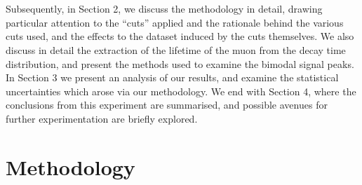 \documentclass[a4paper]{article}
\begin{document}
\\\\
Subsequently, in Section 2, we discuss the methodology in detail, drawing particular attention to the ``cuts'' applied and the rationale behind the various cuts used, and the effects to the dataset induced by the cuts themselves. We also discuss in detail the extraction of the lifetime of the muon from the decay time distribution, and present the methods used to examine the bimodal signal peaks. In Section 3 we present an analysis of our results, and examine the statistical uncertainties which arose via our methodology. We end with Section 4, where the conclusions from this experiment are summarised, and possible avenues for further experimentation are briefly explored.
\newpage
\section{Methodology}%
\end{document}

